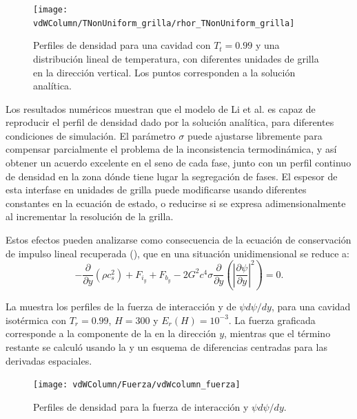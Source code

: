 \begin{figure}[ht]
	\centering
	\texttt{[image: vdWColumn/TNonUniform\_grilla/rhor\_TNonUniform\_grilla]}
	\caption{Perfiles de densidad para una cavidad con $T_t = 0.99$ y una distribuci\'on lineal de temperatura, con diferentes unidades de grilla en la direcci\'on vertical. Los puntos corresponden a la soluci\'on anal\'itica.}
	\label{fig:vdWColumn_TNonUniform_grilla}
\end{figure}


Los resultados num\'ericos muestran que el modelo \pp{} de Li et al. es capaz de reproducir el perfil de densidad dado por la soluci\'on anal\'itica, para diferentes condiciones de simulaci\'on. El par\'ametro $\sigma$ puede ajustarse libremente para compensar parcialmente el problema de la inconsistencia termodin\'amica, y as\'i obtener un acuerdo excelente en el seno de cada fase, junto con un perfil continuo de densidad en la zona d\'onde tiene lugar la segregaci\'on de fases. El espesor de esta interfase en unidades de grilla puede modificarse usando diferentes constantes en la ecuaci\'on de estado, o reducirse si se expresa adimensionalmente al incrementar la resoluci\'on de la grilla.

Estos efectos pueden analizarse como consecuencia de la ecuaci\'on de conservaci\'on de impulso lineal recuperada (), que en una situaci\'on unidimensional se reduce a:
\begin{equation}
	-\dfrac{\partial}{\partial y}(\rho c_s^2) + F_{i_y} + F_{b_y} - 2 G^2 c^4 \sigma \dfrac{\partial}{\partial y} \left( \left| \dfrac{\partial \psi}{\partial y} \right|^2  \right) = 0.
	\label{eq:li_macro_1d}
\end{equation}

La  muestra los perfiles de la fuerza de interacci\'on y de $\psi d\psi / dy$, para una cavidad isot\'ermica con $T_r = 0.99$, $H=300$ y $E_r(H)=10^{-3}$. La fuerza graficada corresponde a la componente de la  en la direcci\'on $y$, mientras que el t\'ermino restante se calcul\'o usando la  y un esquema de diferencias centradas para las derivadas espaciales.


\begin{figure}[ht]
	\centering
	\texttt{[image: vdWColumn/Fuerza/vdWcolumn\_fuerza]}
	\caption{Perfiles de densidad para la fuerza de interacci\'on y $\psi d\psi / dy$.}
	\label{fig:vdWColumn_TUniform_fuerza}
\end{figure}

